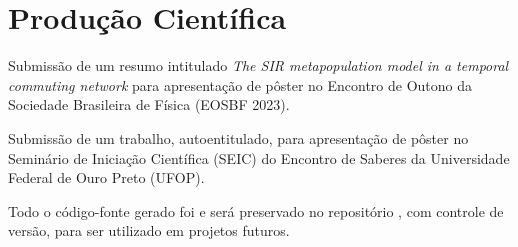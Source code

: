 \chapter{Produção Científica}

Submissão de um resumo intitulado \textit{The SIR metapopulation model in a temporal commuting network} para apresentação de pôster no Encontro de Outono da Sociedade Brasileira de Física (EOSBF 2023).

Submissão de um trabalho, autoentitulado, para apresentação de pôster no Seminário de Iniciação Científica (SEIC) do Encontro de Saberes da Universidade Federal de Ouro Preto (UFOP).

Todo o código-fonte gerado foi e será preservado no repositório , com controle de versão, para ser utilizado em projetos futuros.
